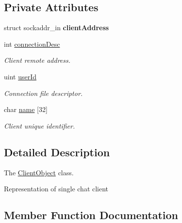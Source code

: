 \subsection*{Private Attributes}
\begin{DoxyCompactItemize}
\item 
\mbox{\label{classClientObject_a9f699539d7adac42a71e4bf6501c0c53}} 
struct sockaddr\+\_\+in {\bfseries client\+Address}
\item 
\mbox{\label{classClientObject_a6592e5413c789857a68b836c7b27c7b1}} 
int \hyperlink{classClientObject_a6592e5413c789857a68b836c7b27c7b1}{connection\+Desc}
\begin{DoxyCompactList}\small\item\em Client remote address. \end{DoxyCompactList}\item 
\mbox{\label{classClientObject_ab4b229b46fe32b699598051074a4f71b}} 
uint \hyperlink{classClientObject_ab4b229b46fe32b699598051074a4f71b}{user\+Id}
\begin{DoxyCompactList}\small\item\em Connection file descriptor. \end{DoxyCompactList}\item 
\mbox{\label{classClientObject_ae5cc4e5bbbb99cdbe152273daa15633a}} 
char \hyperlink{classClientObject_ae5cc4e5bbbb99cdbe152273daa15633a}{name} \mbox{[}32\mbox{]}
\begin{DoxyCompactList}\small\item\em Client unique identifier. \end{DoxyCompactList}\end{DoxyCompactItemize}


\subsection{Detailed Description}
The \hyperlink{classClientObject}{Client\+Object} class. 

Representation of single chat client 

\subsection{Member Function Documentation}
\mbox{\label{classClientObject_a4704430f61bd85efd980c6ea083d5374}} 
